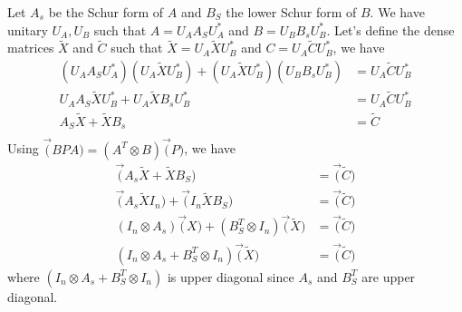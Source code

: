 \begin{solution}
  Let $A_s$ be the Schur form of $A$ and $B_S$ the lower Schur
  form of $B$.
  We have unitary $U_A, U_B$ such that
  $A = U_AA_SU_A^*$ and $B = U_BB_sU_B^*$.
  Let's define the dense matrices $\tilde{X}$ and $\tilde{C}$ such that
  $\tilde{X} = U_A\tilde{X}U_B^*$ and $C = U_A\tilde{C}U_B^*$, we have
  \begin{align*}
    (U_AA_SU_A^*)(U_A\tilde{X}U_B^*) + (U_A\tilde{X}U_B^*)(U_BB_sU_B^*)
    & = U_A\tilde{C}U_B^*\\
    U_AA_S\tilde{X}U_B^* + U_A\tilde{X}B_sU_B^* & = U_A\tilde{C}U_B^*\\
    A_S\tilde{X} + \tilde{X}B_s & = \tilde{C}\\
  \end{align*}
  Using $\vec(BPA) = (A^T \otimes B) \vec(P)$, we have
  \begin{align*}
    \vec(A_s\tilde{X} + \tilde{X}B_S) & = \vec(\tilde{C})\\
    \vec(A_s\tilde{X}I_n) + \vec(I_n\tilde{X}B_S) & = \vec(\tilde{C})\\
    (I_n \otimes A_s) \vec(X) + (B_S^T \otimes I_n) \vec(\tilde{X}) & = \vec(\tilde{C})\\
    (I_n \otimes A_s + B_S^T \otimes I_n) \vec(\tilde{X}) & = \vec(\tilde{C})
  \end{align*}
  where $(I_n \otimes A_s + B_S^T \otimes I_n)$ is upper diagonal
  since $A_s$ and $B_S^T$ are upper diagonal.
\end{solution}

\nosolution

\nosolution
